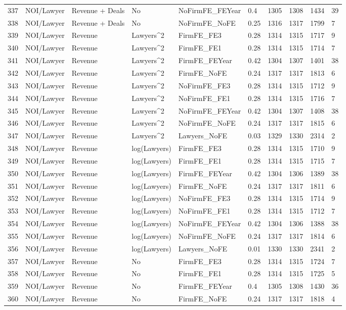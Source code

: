 \begin{table}[ht]
\begin{tabular}{rlllllllll}
  337 & NOI/Lawyer & Revenue + Deals & No & NoFirmFE\_FEYear & 0.4 & 1305 & 1308 & 1434 & 39 \\ 
  338 & NOI/Lawyer & Revenue + Deals & No & NoFirmFE\_NoFE & 0.25 & 1316 & 1317 & 1799 & 7 \\ 
  339 & NOI/Lawyer & Revenue & Lawyers^2 & FirmFE\_FE3 & 0.28 & 1314 & 1315 & 1717 & 9 \\ 
  340 & NOI/Lawyer & Revenue & Lawyers^2 & FirmFE\_FE1 & 0.28 & 1314 & 1315 & 1714 & 7 \\ 
  341 & NOI/Lawyer & Revenue & Lawyers^2 & FirmFE\_FEYear & 0.42 & 1304 & 1307 & 1401 & 38 \\ 
  342 & NOI/Lawyer & Revenue & Lawyers^2 & FirmFE\_NoFE & 0.24 & 1317 & 1317 & 1813 & 6 \\ 
  343 & NOI/Lawyer & Revenue & Lawyers^2 & NoFirmFE\_FE3 & 0.28 & 1314 & 1315 & 1712 & 9 \\ 
  344 & NOI/Lawyer & Revenue & Lawyers^2 & NoFirmFE\_FE1 & 0.28 & 1314 & 1315 & 1716 & 7 \\ 
  345 & NOI/Lawyer & Revenue & Lawyers^2 & NoFirmFE\_FEYear & 0.42 & 1304 & 1307 & 1408 & 38 \\ 
  346 & NOI/Lawyer & Revenue & Lawyers^2 & NoFirmFE\_NoFE & 0.24 & 1317 & 1317 & 1815 & 6 \\ 
  347 & NOI/Lawyer & Revenue & Lawyers^2 & Lawyers\_NoFE & 0.03 & 1329 & 1330 & 2314 & 2 \\ 
  348 & NOI/Lawyer & Revenue & log(Lawyers) & FirmFE\_FE3 & 0.28 & 1314 & 1315 & 1710 & 9 \\ 
  349 & NOI/Lawyer & Revenue & log(Lawyers) & FirmFE\_FE1 & 0.28 & 1314 & 1315 & 1715 & 7 \\ 
  350 & NOI/Lawyer & Revenue & log(Lawyers) & FirmFE\_FEYear & 0.42 & 1304 & 1306 & 1389 & 38 \\ 
  351 & NOI/Lawyer & Revenue & log(Lawyers) & FirmFE\_NoFE & 0.24 & 1317 & 1317 & 1811 & 6 \\ 
  352 & NOI/Lawyer & Revenue & log(Lawyers) & NoFirmFE\_FE3 & 0.28 & 1314 & 1315 & 1714 & 9 \\ 
  353 & NOI/Lawyer & Revenue & log(Lawyers) & NoFirmFE\_FE1 & 0.28 & 1314 & 1315 & 1712 & 7 \\ 
  354 & NOI/Lawyer & Revenue & log(Lawyers) & NoFirmFE\_FEYear & 0.42 & 1304 & 1306 & 1388 & 38 \\ 
  355 & NOI/Lawyer & Revenue & log(Lawyers) & NoFirmFE\_NoFE & 0.24 & 1317 & 1317 & 1814 & 6 \\ 
  356 & NOI/Lawyer & Revenue & log(Lawyers) & Lawyers\_NoFE & 0.01 & 1330 & 1330 & 2341 & 2 \\ 
  357 & NOI/Lawyer & Revenue & No & FirmFE\_FE3 & 0.28 & 1314 & 1315 & 1724 & 7 \\ 
  358 & NOI/Lawyer & Revenue & No & FirmFE\_FE1 & 0.28 & 1314 & 1315 & 1725 & 5 \\ 
  359 & NOI/Lawyer & Revenue & No & FirmFE\_FEYear & 0.4 & 1305 & 1308 & 1430 & 36 \\ 
  360 & NOI/Lawyer & Revenue & No & FirmFE\_NoFE & 0.24 & 1317 & 1317 & 1818 & 4 \\ 
   \hline
\end{tabular}
\end{table}

